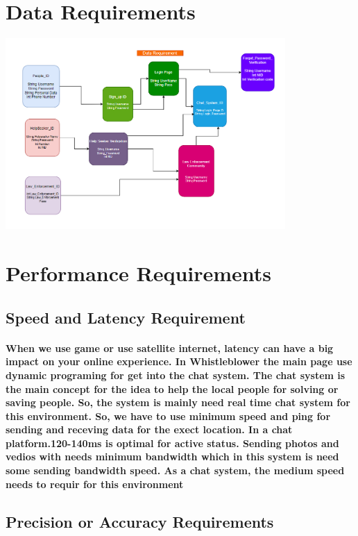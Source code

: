 \documentclass{article}
\begin{document}
\section{Data Requirements}
\includegraphics[width=0.8\textwidth]{Data_Requirement.png}



\section{Performance Requirements}
\subsection{Speed and Latency Requirement}

\paragraph{When we use game or use satellite internet, latency can have a big impact on your online experience. In Whistleblower the main page use dynamic programing for get into the chat system. The chat system is the main concept for the idea to help the local people for solving or saving people. So, the system is mainly need real time chat system for this environment. So, we have to use minimum speed and ping for sending and receving data for the exect location. In a
chat platform.120-140ms is optimal for active status. Sending photos and vedios with needs minimum bandwidth which in this system is need some sending bandwidth speed. As a chat system, the medium speed needs to requir for this environment}

\newpage
\subsection{Precision or Accuracy Requirements }
\end{document}
